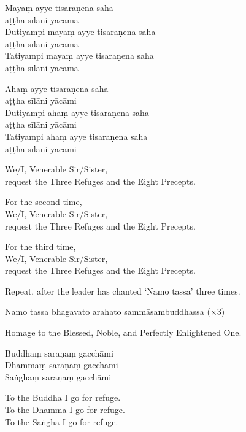 
Mayaṃ ayye tisaraṇena saha\\\vin aṭṭha sīlāni yācāma\\
Dutiyampi mayaṃ ayye tisaraṇena saha\\\vin aṭṭha sīlāni yācāma\\
Tatiyampi mayaṃ ayye tisaraṇena saha\\\vin aṭṭha sīlāni yācāma


Ahaṃ ayye tisaraṇena saha\\\vin aṭṭha sīlāni yācāmi\\
Dutiyampi ahaṃ ayye tisaraṇena saha\\\vin aṭṭha sīlāni yācāmi\\
Tatiyampi ahaṃ ayye tisaraṇena saha\\\vin aṭṭha sīlāni yācāmi

\begin{english}
  We/I, Venerable Sir/Sister,\\
  request the Three Refuges and the Eight Precepts.

  For the second time,\\
  We/I, Venerable Sir/Sister,\\
  request the Three Refuges and the Eight Precepts.

  For the third time,\\
  We/I, Venerable Sir/Sister,\\
  request the Three Refuges and the Eight Precepts.
\end{english}

\begin{instruction}
  Repeat, after the leader has chanted ‘Namo tassa’ three times.
\end{instruction}

Namo tassa bhagavato arahato sammāsambuddhassa (×3)

\begin{english}
  Homage to the Blessed, Noble, and Perfectly Enlightened One.
\end{english}

\ifhandbookedition
\clearpage
\fi

Buddhaṃ saraṇaṃ gacchāmi\\
Dhammaṃ saraṇaṃ gacchāmi\\
Saṅghaṃ saraṇaṃ gacchāmi

\begin{english}
  To the Buddha I go for refuge.\\
  To the Dhamma I go for refuge.\\
  To the Saṅgha I go for refuge.
\end{english}

